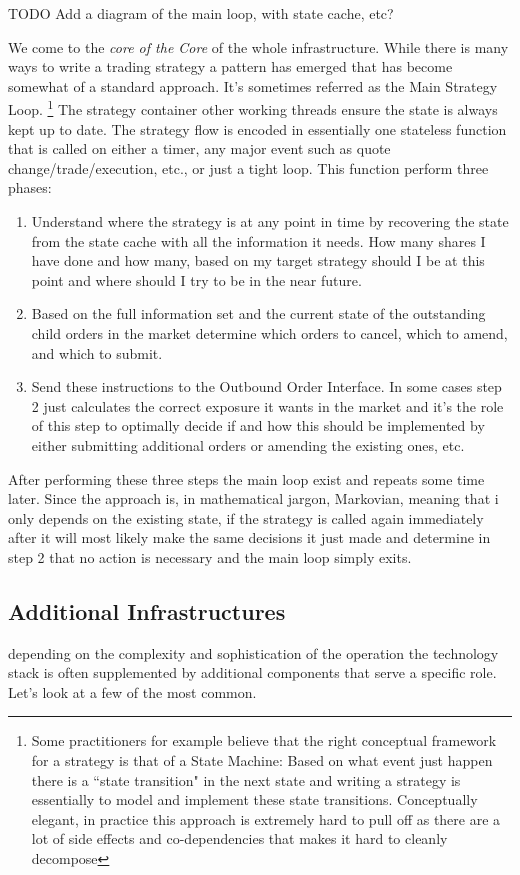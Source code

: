 TODO Add a diagram of the main loop, with state cache, etc?

We come to the \emph{core of the Core} of the whole infrastructure. While there is many ways to write a trading strategy a pattern has emerged that has become somewhat of a standard approach. It's sometimes referred as the Main Strategy Loop. \footnote{Some practitioners for example believe that the right conceptual framework for a strategy is that of a State Machine: Based on what event just happen there is a ``state transition" in the next state and writing a strategy is essentially to model and implement these state transitions. Conceptually elegant, in practice this approach is extremely hard to pull off as there are a lot of side effects and co-dependencies that makes it hard to cleanly decompose}
The strategy container other working threads ensure the state is always kept up to date. The strategy flow is encoded in essentially one stateless function that is called on either a timer, any major event such as quote change/trade/execution, etc., or just a tight loop. This function perform three phases:
\begin{enumerate}
\item Understand where the strategy is at any point in time by recovering the state from the state cache with all the information it needs. How many shares I have done and how many, based on my target strategy should I be at this point and where should I try to be in the near future. 
\item Based on the full information set and the current state of the outstanding child orders in the market determine which orders to cancel, which to amend, and which to submit.
\item Send these instructions to the Outbound Order Interface. In some cases step 2 just calculates the correct exposure it wants in the market and it's the role of this step to optimally decide if and how this should be implemented by either submitting additional orders or amending the existing ones, etc.
\end{enumerate}
After performing these three steps the main loop exist and repeats some time later. Since the approach is, in mathematical jargon, Markovian, meaning that i only depends on the existing state, if the strategy is called again immediately after it will most likely make the same decisions it just made and determine in step 2 that no action is necessary and the main loop simply exits.

\subsection{Additional Infrastructures}
depending on the complexity and sophistication of the operation the technology stack is often supplemented by additional components that serve a specific role. Let's look at a few of the most common.
